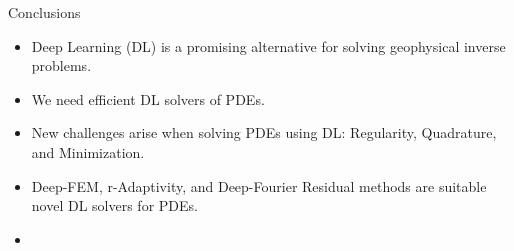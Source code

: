 \begin{frame}{Conclusions}

\vspace{0.1cm}
\begin{itemize}
\item Deep Learning (DL) is a promising alternative for solving geophysical inverse problems.
\vspace{0.3cm}
\item We need efficient DL solvers of PDEs.
\vspace{0.3cm}
\item New challenges arise when solving PDEs using DL: Regularity, Quadrature, and Minimization.
\vspace{0.3cm}
\item Deep-FEM, r-Adaptivity, and Deep-Fourier Residual methods are suitable novel DL solvers for PDEs.
\vspace{0.3cm}
\item {\color{red}{DL solvers for PDEs are at their infancy: we have work ahead....}}
\end{itemize}
%
%
%

\end{frame}



